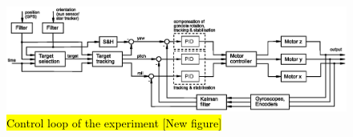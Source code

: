 
\newpage
\begin{landscape}
	\begin{figure}
		\includegraphics[width=\linewidth]{4-experiment-design/img/software/Control_loop.eps}
		\caption{\hl{Control loop of the experiment [New figure]}}
		\label{fig::software::control_loop}
	\end{figure}
\end{landscape}


\raggedbottom

